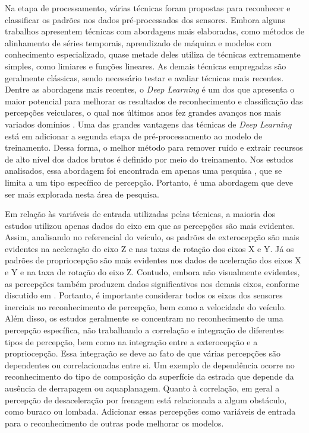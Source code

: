 Na etapa de processamento, várias técnicas foram propostas para reconhecer e classificar os padrões nos dados pré-processados dos sensores. Embora alguns trabalhos apresentem técnicas com abordagens mais elaboradas, como métodos de alinhamento de séries temporais, aprendizado de máquina e modelos com conhecimento especializado, quase metade deles utiliza de técnicas extremamente simples, como limiares e funções lineares. As demais técnicas empregadas são geralmente clássicas, sendo necessário testar e avaliar técnicas mais recentes. Dentre as abordagens mais recentes, o \textit{Deep Learning} é um dos que apresenta o maior potencial para melhorar os resultados de reconhecimento e classificação das percepções veiculares, o qual nos últimos anos fez grandes avanços nos mais variados domínios \cite{LeCun2015}. Uma das grandes vantagens das técnicas de \textit{Deep Learning} está em adicionar a segunda etapa de pré-processamento ao modelo de treinamento. Dessa forma, o melhor método para remover ruído e extrair recursos de alto nível dos dados brutos é definido por meio do treinamento. Nos estudos analisados, essa abordagem foi encontrada em apenas uma pesquisa \cite{Saleh2017}, que se limita a um tipo específico de percepção. Portanto, é uma abordagem que deve ser mais explorada nesta área de pesquisa.

Em relação às variáveis de entrada utilizadas pelas técnicas, a maioria dos estudos utilizou apenas dados do eixo em que as percepções são mais evidentes. Assim, analisando no referencial do veículo, os padrões de exterocepção são mais evidentes na aceleração do eixo Z e nas taxas de rotação dos eixos X e Y. Já os padrões de propriocepção são mais evidentes nos dados de aceleração dos eixos X e Y e na taxa de rotação do eixo Z. Contudo, embora não visualmente evidentes, as percepções também produzem dados significativos nos demais eixos, conforme discutido em \cite{M.2017}. Portanto, é importante considerar todos os eixos dos sensores inerciais no reconhecimento de percepção, bem como a velocidade do veículo. Além disso, os estudos geralmente se concentram no reconhecimento de uma percepção específica, não trabalhando a correlação e integração de diferentes tipos de percepção, bem como na integração entre a exterocepção e a propriocepção. Essa integração se deve ao fato de que várias percepções são dependentes ou correlacionadas entre si. Um exemplo de dependência ocorre no reconhecimento do tipo de composição da superfície da estrada que depende da ausência de derrapagem ou aquaplanagem. Quanto à correlação, em geral a percepção de desaceleração por frenagem está relacionada a algum obstáculo, como buraco ou lombada. Adicionar essas percepções como variáveis de entrada para o reconhecimento de outras pode melhorar os modelos. 

